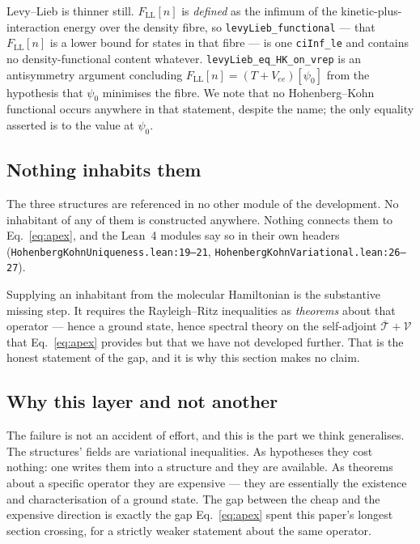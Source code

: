 \documentclass[aps,prd,reprint,nofootinbib,superscriptaddress]{revtex4-2}
\newcommand{\thm}[1]{\texttt{#1}}   %
\newcommand{\src}[1]{\texttt{#1}}   %
\newcommand{\Lean}{Lean~4}
\begin{document}
Levy--Lieb is thinner still. $F_{\mathrm{LL}}[n]$ is \emph{defined} as the infimum of the
kinetic-plus-interaction energy over the density fibre, so \thm{levyLieb\_functional} --- that
$F_{\mathrm{LL}}[n]$ is a lower bound for states in that fibre --- is one \texttt{ciInf\_le} and
contains no density-functional content whatever. \thm{levyLieb\_eq\_HK\_on\_vrep} is an antisymmetry
argument concluding $F_{\mathrm{LL}}[n]=(T{+}V_{ee})[\psi_{0}]$ from the hypothesis that $\psi_{0}$
minimises the fibre. We note that no Hohenberg--Kohn functional occurs anywhere in that statement,
despite the name; the only equality asserted is to the value at $\psi_{0}$.

\subsection{Nothing inhabits them}

The three structures are referenced in no other module of the development. No inhabitant of any of
them is constructed anywhere. Nothing connects them to Eq.~\eqref{eq:apex}, and the \Lean{} modules
say so in their own headers (\src{HohenbergKohnUniqueness.lean:19--21},
\src{HohenbergKohnVariational.lean:26--27}).

Supplying an inhabitant from the molecular Hamiltonian is the substantive missing step. It requires
the Rayleigh--Ritz inequalities as \emph{theorems} about that operator --- hence a ground state, hence
spectral theory on the self-adjoint $\overline{\mathcal{T}}+\mathcal{V}$ that Eq.~\eqref{eq:apex}
provides but that we have not developed further. That is the honest statement of the gap, and it is
why this section makes no claim.

\subsection{Why this layer and not another}

The failure is not an accident of effort, and this is the part we think generalises. The structures'
fields are variational inequalities. As hypotheses they cost nothing: one writes them into a
structure and they are available. As theorems about a specific operator they are expensive --- they
are essentially the existence and characterisation of a ground state. The gap between the cheap and
the expensive direction is exactly the gap Eq.~\eqref{eq:apex} spent this paper's longest section
crossing, for a strictly weaker statement about the same operator.
\end{document}
